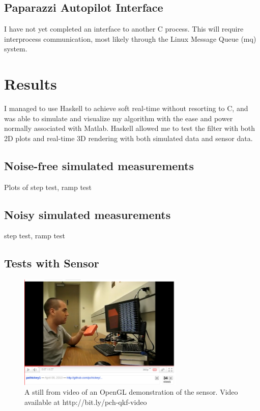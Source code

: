 \documentclass[12pt]{report}
\begin{document}
\subsection{Paparazzi Autopilot Interface}
I have not yet completed an interface to another C process. This will require interprocess communication, most likely through the Linux Message Queue (mq) system.

\section{Results}

I managed to use Haskell to achieve soft real-time without resorting to C, and was able to simulate and visualize my algorithm with the ease and power normally associated with Matlab. Haskell allowed me to test the filter with both 2D plots and real-time 3D rendering with both simulated data and sensor data.

\subsection{Noise-free simulated measurements}
Plots of step test, ramp test
\subsection{Noisy simulated measurements}
step test, ramp test
\subsection{Tests with Sensor}
\begin{figure}
  \centering
    \includegraphics[width=0.7\textwidth]{./youtube-screenshot.png}
  \caption{A still from video of an OpenGL demonstration of the sensor. Video available at http://bit.ly/pch-qkf-video}
\end{figure}
\end{document}
